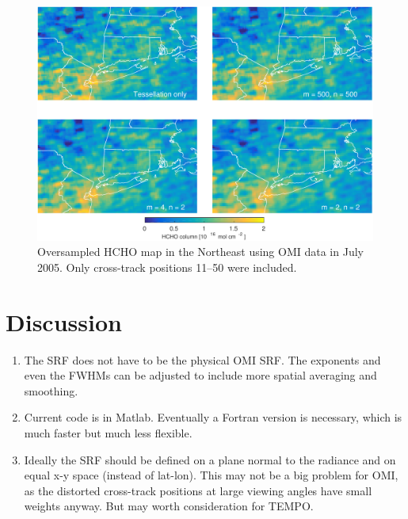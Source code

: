 \documentclass[hidelinks,12pt]{article}
\begin{document}
\begin{figure}[hbtp]
 \centering
 \includegraphics[width=.8\linewidth]{../plot/L3_compare.pdf}
 \caption{Oversampled HCHO map in the Northeast using OMI data in July 2005. Only cross-track positions 11--50 were included.}
 \label{fig6}
 \end{figure}
\section{Discussion}
\begin{enumerate}
\item The SRF does not have to be the physical OMI SRF. The exponents and even the FWHMs can be adjusted to include more spatial averaging and smoothing.
\item Current code is in Matlab. Eventually a Fortran version is necessary, which is much faster but much less flexible. 
\item Ideally the SRF should be defined on a plane normal to the radiance and on equal x-y space (instead of lat-lon). This may not be a big problem for OMI, as the distorted cross-track positions at large viewing angles have small weights anyway. But may worth consideration for TEMPO.
\end{enumerate}
\clearpage


\end{document}
